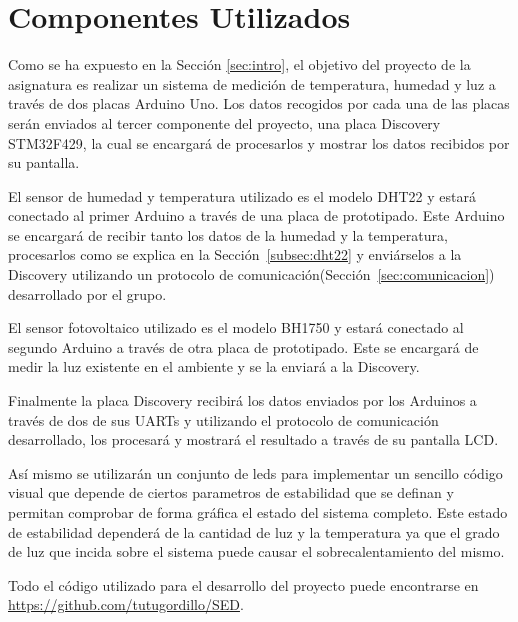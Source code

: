 \section{Componentes Utilizados}\label{sec:arquitectura}

Como se ha expuesto en la Secci\'on \ref{sec:intro}, el objetivo del
proyecto de la asignatura es realizar un sistema de medici\'on de
temperatura, humedad y luz a trav\'es de dos placas Arduino Uno. Los
datos recogidos por cada una de las placas ser\'an enviados al tercer
componente del proyecto, una placa Discovery STM32F429, la cual se
encargar\'a de procesarlos y mostrar los datos recibidos por su
pantalla.

El sensor de humedad y temperatura utilizado es el modelo DHT22 y
estar\'a conectado al primer Arduino a trav\'es de una placa de
prototipado. Este Arduino se encargar\'a de recibir tanto los datos de
la humedad y la temperatura, procesarlos como se explica en la
Secci\'on~\ref{subsec:dht22} y envi\'arselos a la Discovery utilizando
un protocolo de comunicaci\'on(Secci\'on~\ref{sec:comunicacion}) desarrollado por el grupo.

El sensor fotovoltaico utilizado es el modelo BH1750 y estar\'a
conectado al segundo Arduino a trav\'es de otra placa de
prototipado. Este se encargar\'a de medir la luz existente en el
ambiente y se la enviar\'a a la Discovery. %

Finalmente la placa Discovery recibir\'a los datos enviados por los
Arduinos a trav\'es de dos de sus UARTs y utilizando el protocolo de
comunicaci\'on desarrollado, los procesar\'a y mostrar\'a el resultado
a trav\'es de su pantalla LCD.

As\'i mismo se utilizar\'an un conjunto de leds para implementar un
sencillo c\'odigo visual que depende de ciertos parametros de
estabilidad que se definan y permitan comprobar de forma gr\'afica el
estado del sistema completo. Este estado de estabilidad depender\'a de
la cantidad de luz y la temperatura ya que el grado de luz que incida
sobre el sistema puede causar el sobrecalentamiento del mismo.

Todo el c\'odigo utilizado para el desarrollo del proyecto puede
encontrarse en \url{https://github.com/tutugordillo/SED}.
